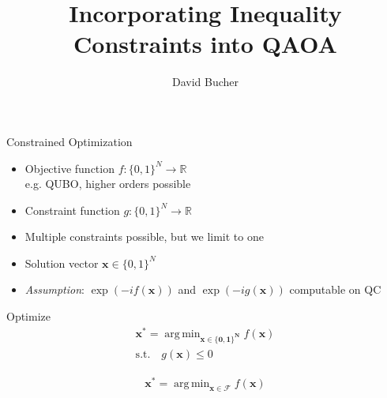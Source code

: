 \documentclass[aspectratio=169]{beamer}
\author{David Bucher}
\title{Incorporating Inequality Constraints into QAOA}
\DeclareMathOperator*{\argmin}{arg\,min}
\begin{document}
\maketitle

\begin{frame}{Constrained Optimization}
    \begin{minipage}{0.5\textwidth}
        \begin{itemize}
            \item Objective function $f: \{0, 1\}^N \rightarrow
                \mathbb{R}$\\e.g. QUBO, higher orders possible
            \item Constraint function $g: \{0, 1\}^N \rightarrow
                \mathbb{R}$
            \item Multiple constraints possible, but we limit to one
            \item Solution vector $\mathbf{x} \in \{0, 1\}^N$
            \item \emph{Assumption}: $\exp(-i f(\mathbf{x}))$ and $\exp(-i
                g(\mathbf{x}))$ computable on QC
        \end{itemize}
    \end{minipage}%
    \begin{minipage}{0.5\textwidth}
        \begin{block}{Optimize}
            \centering
            \vspace{-10pt}
            \begin{gather*}
                \mathbf{x}^* = \argmin_\mathbf{x \in \{0, 1\}^N} f(\mathbf{x})\\
                \text{s.t.}\quad g(\mathbf{x}) \leq 0
            \end{gather*}
            \begin{gather*}
                \mathbf{x}^* = \argmin_\mathbf{x \in \mathcal{F}} f(\mathbf{x})
            \end{gather*}
        \end{block}
    \end{minipage}
\end{frame}
\end{document}
